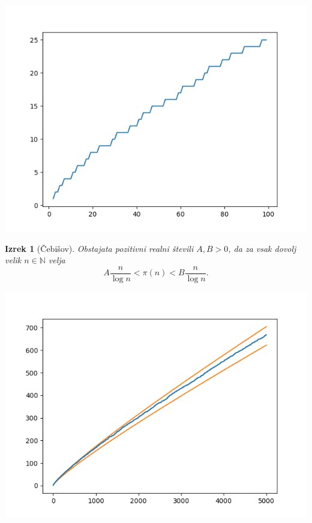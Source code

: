 \documentclass{beamer}
\newtheorem{izrek}{Izrek}
\def\N{\mathbb{N}}
\begin{document}

\begin{frame}
    \centering
    \includegraphics[height=0.95\textheight]{pi.png}
\end{frame}


\begin{frame}
    \begin{izrek}[Čebišov]
        Obstajata pozitivni realni števili $A, B > 0$, da za vsak dovolj velik $n \in \N$ velja $$A\frac{n}{\log{n}} < \pi(n) < B\frac{n}{\log{n}}.$$
    \end{izrek}
\end{frame}


\begin{frame}
    \centering
    \includegraphics[height=0.95\textheight]{cebisov.png}
\end{frame}
\end{document}

